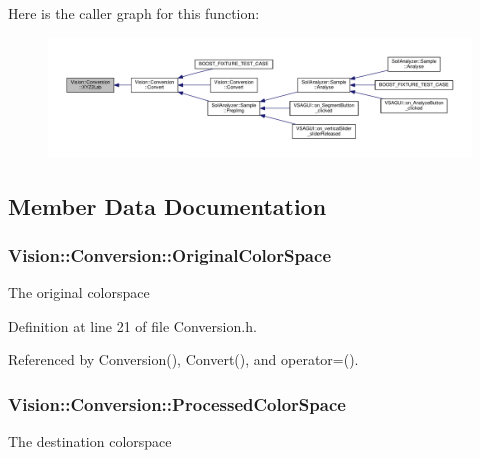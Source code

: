 Here is the caller graph for this function\+:\nopagebreak
\begin{figure}[H]
\begin{center}
\leavevmode
\includegraphics[width=350pt]{class_vision_1_1_conversion_a9ecc41c4226eafc55d0ee0cc550e593b_icgraph}
\end{center}
\end{figure}




\subsection{Member Data Documentation}
\hypertarget{class_vision_1_1_conversion_a3fd4bac8a8d6788b6a1886916c5464b4}{}
\subsubsection[{Original\+Color\+Space}]{ Vision\+::\+Conversion\+::\+Original\+Color\+Space}\label{class_vision_1_1_conversion_a3fd4bac8a8d6788b6a1886916c5464b4}
The original colorspace 

Definition at line 21 of file Conversion.\+h.



Referenced by Conversion(), Convert(), and operator=().

\hypertarget{class_vision_1_1_conversion_a57337750cb60b9ff7ed269c184d1fda7}{}
\subsubsection[{Processed\+Color\+Space}]{ Vision\+::\+Conversion\+::\+Processed\+Color\+Space}\label{class_vision_1_1_conversion_a57337750cb60b9ff7ed269c184d1fda7}
The destination colorspace 

